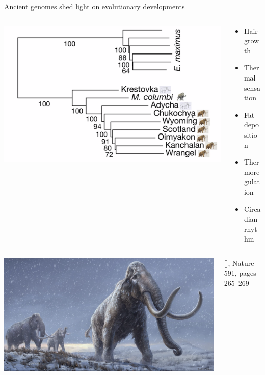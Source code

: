 \documentclass[10pt]{beamer}
\newcommand{\credit}[1]{{\vspace{\fill} \par \raggedleft \scriptsize \mdseries \color{mDarkBrown} #1 \par}}
\newcommand{\citeme}[1]{{\xspace\color{scAqua} \scriptsize [\cite{#1}]}}
\begin{document}
\begin{frame}{Ancient genomes shed light on evolutionary developments}
\begin{columns}
	\begin{column}{0.65\textwidth}
		\begin{center}
			\includegraphics[width=\textwidth]{./figures/mammoth_tree.png}
		\end{center}
	\end{column}
	\begin{column}{0.35\textwidth}
		\begin{itemize}
			\item Hair growth
			\item Thermal sensation
			\item Fat deposition
			\item Thermoregulation
			\item Circadian rhythm
		\end{itemize}
	\end{column}
\end{columns}
\begin{columns}
	\begin{column}{0.5\textwidth}
		\begin{center}
			\includegraphics[width=\textwidth]{./figures/mammoth.png}
	\end{center}\end{column}
	\begin{column}{0.5\textwidth}
		\vspace{3cm} 
		\credit{\citeme{Valk2021}, Nature 591, pages 265–269}
	\end{column}
\end{columns}
\end{frame}
\end{document}
